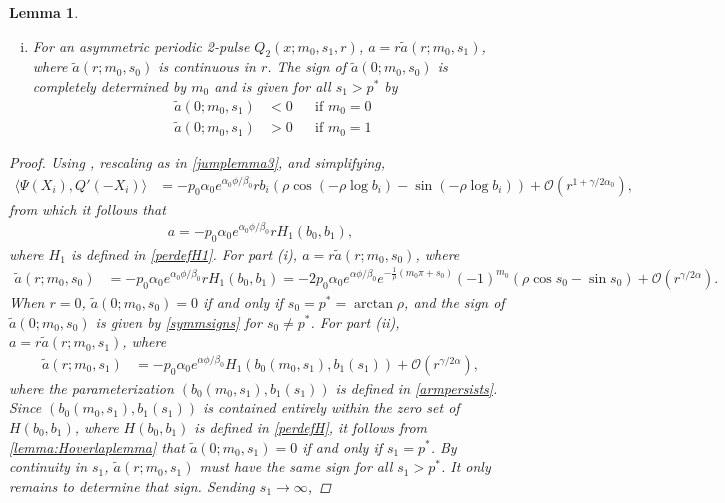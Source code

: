 \documentclass[10pt,reqno]{amsart}
\theoremstyle{plain}
\newtheorem{lemma}[theorem]{Lemma}
\theoremstyle{definition}
\theoremstyle{remark}
\numberwithin{theorem}{section}
\numberwithin{equation}{section}
\begin{document}
\begin{lemma}
\begin{enumerate}[(i)]
	\item For an asymmetric periodic 2-pulse $Q_2(x; m_0, s_1, r)$, $a = r \tilde{a}(r; m_0, s_1)$, where $\tilde{a}(r; m_0, s_0)$ is continuous in $r$. The sign of $\tilde{a}(0; m_0, s_0)$ is completely determined by $m_0$ and is given for all $s_1 > p^*$ by
	\begin{equation}\label{asymmsigns}
	\begin{aligned}
	\tilde{a}(0; m_0, s_1) &< 0 && \text{if }m_0 = 0 \\
	\tilde{a}(0; m_0, s_1) &> 0 && \text{if }m_0 = 1
	\end{aligned}
	\end{equation}
\end{enumerate}	
\begin{proof}
Using \cite[Lemma 6.1(ii)]{Sandstede1998}, rescaling as in \cref{jumplemma3}, and simplifying, 
\begin{align*}
\langle \Psi(X_i), Q'(-X_i) \rangle &=
-p_0 \alpha_0 e^{\alpha_0 \phi/\beta_0} r b_i \left( \rho \cos\left(-\rho \log b_i \right) - \sin \left(-\rho \log b_i \right) \right) + \mathcal{O}(r^{1+\gamma/2\alpha_0}),
\end{align*}
from which it follows that
\begin{align}\label{aform}
a = -p_0 \alpha_0 e^{\alpha_0 \phi/\beta_0} r H_1(b_0, b_1),
\end{align}
where $H_1$ is defined in \cref{perdefH1}. 
For part (i), $a = r \tilde{a}(r; m_0, s_0)$, where
\begin{align*}
\tilde{a}(r; m_0, s_0) &= -p_0 \alpha_0 e^{\alpha_0 \phi/\beta_0} r H_1(b_0, b_1) = -2 p_0 \alpha_0 e^{\alpha \phi/\beta_0} e^{-\frac{1}{\rho}(m_0 \pi + s_0)} (-1)^{m_0} \left( \rho \cos s_0 - \sin s_0 \right) + \mathcal{O}(r^{\gamma/2\alpha}).
\end{align*}
When $r = 0$, $\tilde{a}(0; m_0, s_0) = 0$ if and only if $s_0 = p^* = \arctan \rho$, and the sign of $\tilde{a}(0; m_0, s_0)$ is given by \cref{symmsigns} for $s_0 \neq p^*$. 
For part (ii), $a = r \tilde{a}(r; m_0, s_1)$, where
\begin{align*}
\tilde{a}(r; m_0, s_1) &= -p_0 \alpha_0 e^{\alpha \phi/\beta_0} H_1( b_0(m_0, s_1), b_1(s_1) ) + \mathcal{O}(r^{\gamma/2\alpha}),
\end{align*}
where the parameterization $(b_0(m_0, s_1), b_1(s_1))$ is defined in \cref{armpersists}. Since $(b_0(m_0, s_1), b_1(s_1))$ is contained entirely within the zero set of $H(b_0, b_1)$, where $H(b_0, b_1)$ is defined in \cref{perdefH}, it follows from \cref{lemma:Hoverlaplemma} that $\tilde{a}(0; m_0, s_1) = 0$ if and only if $s_1 = p^*$. By continuity in $s_1$, $\tilde{a}(r; m_0, s_1)$ must have the same sign for all $s_1 > p^*$. It only remains to determine that sign. Sending $s_1 \rightarrow \infty$,

\end{proof}
\end{lemma}
\end{document}
